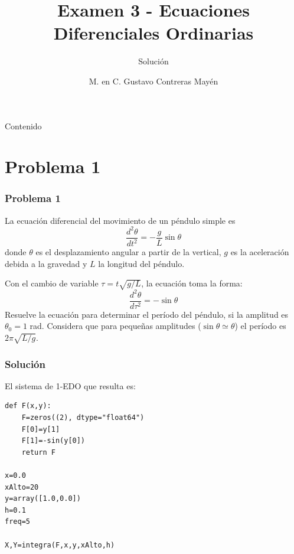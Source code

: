 


\title{Examen 3 - Ecuaciones Diferenciales Ordinarias}
\subtitle{Soluci\'{o}n}
\author{M. en C. Gustavo Contreras May\'{e}n}
\maketitle
\fontsize{14}{14}\selectfont
{}
\begin{frame}{Contenido}
\tableofcontents[pausesections]
\end{frame}
\section{Problema 1}
\begin{frame}[fragile]
\frametitle{Problema 1}
La ecuaci\'{o}n diferencial del movimiento de un p\'{e}ndulo simple es
\[ \dfrac{d^{2} \theta}{d t^{2}} = - \dfrac{g}{L} \sin \theta \]
donde
$\theta$ es el desplazamiento angular a partir de la vertical, $g$ es la aceleraci\'{o}n debida a la gravedad y $L$ la longitud del p\'{e}ndulo.
\end{frame}
\begin{frame}
Con el cambio de variable $\tau = t \sqrt{g/L}$, la ecuaci\'{o}n toma la forma:
\[ \dfrac{d^{2} \theta}{d \tau^{2}} = -  \sin \theta\]
Resuelve la ecuaci\'{o}n para determinar el per\'{i}odo del p\'{e}ndulo, si la amplitud es $\theta_{0} = 1$ rad. Considera que para pequeñas amplitudes ($\sin \theta \simeq \theta$) el per\'{i}odo es $2 \pi \sqrt{L/g}$.
\end{frame}
\begin{frame}[fragile]
\frametitle{Soluci\'{o}n}
El sistema de 1-EDO que resulta es:
\begin{lstlisting}
def F(x,y):
    F=zeros((2), dtype="float64")
    F[0]=y[1]
    F[1]=-sin(y[0])
    return F

x=0.0
xAlto=20
y=array([1.0,0.0])
h=0.1
freq=5

X,Y=integra(F,x,y,xAlto,h)
\end{lstlisting}
\end{frame}
